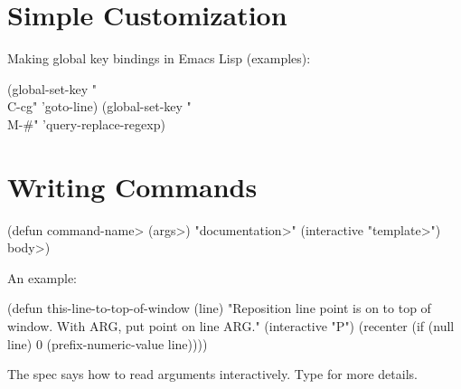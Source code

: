 \section{Simple Customization}



Making global key bindings in Emacs Lisp (examples):

\beginexample%
(global-set-key "\\C-cg" 'goto-line)
(global-set-key "\\M-\#" 'query-replace-regexp)
\endexample

\section{Writing Commands}

\beginexample%
(defun \<command-name> (\<args>)
  "\<documentation>" (interactive "\<template>")
  \<body>)
\endexample

An example:

\beginexample%
(defun this-line-to-top-of-window (line)
  "Reposition line point is on to top of window.
With ARG, put point on line ARG."
  (interactive "P")
  (recenter (if (null line)
                0
              (prefix-numeric-value line))))
\endexample

The  spec says how to read arguments interactively.
Type  for more details.

\copyrightnotice

\bye

